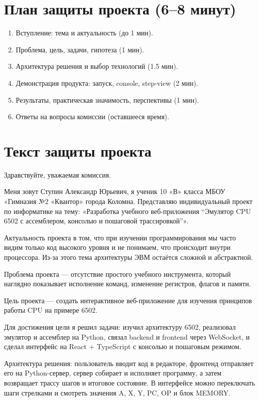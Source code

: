 \documentclass[12pt,a4paper]{article}
\begin{document}
\newpage
\section*{План защиты проекта (6--8 минут)}

\begin{enumerate}
  \item Вступление: тема и актуальность (до 1 мин).
  \item Проблема, цель, задачи, гипотеза (1 мин).
  \item Архитектура решения и выбор технологий (1.5 мин).
  \item Демонстрация продукта: запуск, console, step-view (2 мин).
  \item Результаты, практическая значимость, перспективы (1 мин).
  \item Ответы на вопросы комиссии (оставшееся время).
\end{enumerate}

\newpage
\section*{Текст защиты проекта}

Здравствуйте, уважаемая комиссия.

Меня зовут Ступин Александр Юрьевич, я ученик 10 «В» класса МБОУ «Гимназия №2 «Квантор» города Коломна. Представляю индивидуальный проект по информатике на тему: «Разработка учебного веб-приложения “Эмулятор CPU 6502 с ассемблером, консолью и пошаговой трассировкой”».

Актуальность проекта в том, что при изучении программирования мы часто видим только код высокого уровня и не понимаем, что происходит внутри процессора. Из-за этого тема архитектуры ЭВМ остаётся сложной и абстрактной.

Проблема проекта --- отсутствие простого учебного инструмента, который наглядно показывает исполнение команд, изменение регистров, флагов и памяти.

Цель проекта --- создать интерактивное веб-приложение для изучения принципов работы CPU на примере 6502.

Для достижения цели я решил задачи: изучил архитектуру 6502, реализовал эмулятор и ассемблер на Python, связал backend и frontend через WebSocket, и сделал интерфейс на React + TypeScript с консолью и пошаговым режимом.

Архитектура решения: пользователь вводит код в редакторе, фронтенд отправляет его на Python-сервер, сервер собирает и исполняет программу, а затем возвращает трассу шагов и итоговое состояние. В интерфейсе можно переключать шаги стрелками и смотреть значения A, X, Y, PC, OP и блок MEMORY.
\end{document}
